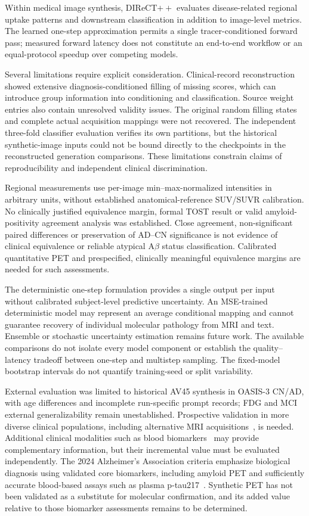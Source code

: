 Within medical image synthesis, DIReCT$++$ evaluates disease-related regional uptake patterns and downstream classification in addition to image-level metrics. The learned one-step approximation permits a single tracer-conditioned forward pass; measured forward latency does not constitute an end-to-end workflow or an equal-protocol speedup over competing models.

Several limitations require explicit consideration. Clinical-record reconstruction showed extensive diagnosis-conditioned filling of missing scores, which can introduce group information into conditioning and classification. Source weight entries also contain unresolved validity issues. The original random filling states and complete actual acquisition mappings were not recovered. The independent three-fold classifier evaluation verifies its own partitions, but the historical synthetic-image inputs could not be bound directly to the checkpoints in the reconstructed generation comparisons. These limitations constrain claims of reproducibility and independent clinical discrimination.

Regional measurements use per-image min--max-normalized intensities in arbitrary units, without established anatomical-reference SUV/SUVR calibration. No clinically justified equivalence margin, formal TOST result or valid amyloid-positivity agreement analysis was established. Close agreement, non-significant paired differences or preservation of AD--CN significance is not evidence of clinical equivalence or reliable atypical A$\beta$ status classification. Calibrated quantitative PET and prespecified, clinically meaningful equivalence margins are needed for such assessments.

The deterministic one-step formulation provides a single output per input without calibrated subject-level predictive uncertainty. An MSE-trained deterministic model may represent an average conditional mapping and cannot guarantee recovery of individual molecular pathology from MRI and text. Ensemble or stochastic uncertainty estimation remains future work. The available comparisons do not isolate every model component or establish the quality--latency tradeoff between one-step and multistep sampling. The fixed-model bootstrap intervals do not quantify training-seed or split variability.

External evaluation was limited to historical AV45 synthesis in OASIS-3 CN/AD, with age differences and incomplete run-specific prompt records; FDG and MCI external generalizability remain unestablished. Prospective validation in more diverse clinical populations, including alternative MRI acquisitions~\cite{sorby2024portable}, is needed. Additional clinical modalities such as blood biomarkers~\cite{hansson2023blood} may provide complementary information, but their incremental value must be evaluated independently. The 2024 Alzheimer's Association criteria emphasize biological diagnosis using validated core biomarkers, including amyloid PET and sufficiently accurate blood-based assays such as plasma p-tau217~\cite{jack2024revised}. Synthetic PET has not been validated as a substitute for molecular confirmation, and its added value relative to those biomarker assessments remains to be determined.

